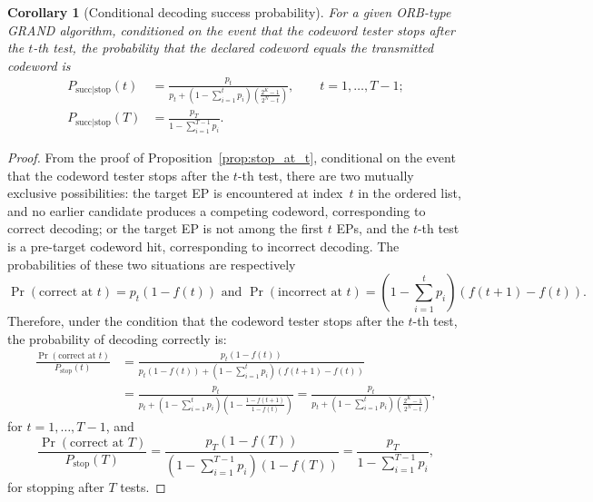 \documentclass[letterpaper,draftclsnofoot,onecolumn]{IEEEtran}
\newtheorem{corollary}{Corollary}
\begin{document}
\begin{corollary}[Conditional decoding success probability]\label{coro:stop_succ_prob}
    For a given ORB-type GRAND algorithm, conditioned on the event that the codeword tester stops after the $t$-th test, the probability that the declared codeword equals the transmitted codeword is
    \begin{align}
        P_{\text{succ}\mid\text{stop}}(t) &= \frac{p_t}{p_t + (1 - \sum_{i=1}^{t}p_i)\left( \frac{2^K-1}{2^N-t}\right)}, \quad\quad t = 1, \ldots, T - 1;\\
        P_{\text{succ}\mid\text{stop}}(T) &= \frac{p_T}{1 - \sum_{i=1}^{T-1}p_i}.
    \end{align}
\end{corollary}
\begin{proof}
    From the proof of Proposition~\ref{prop:stop_at_t}, conditional on the event that the codeword tester stops after the $t$-th test, there are two mutually exclusive possibilities: the target EP is encountered at index~$t$ in the ordered list, and no earlier candidate produces a competing codeword, corresponding to correct decoding; or the target EP is not among the first $t$ EPs, and the $t$-th test is a pre-target codeword hit, corresponding to incorrect decoding. The probabilities of these two situations are respectively
    \begin{equation}
        \Pr(\text{correct at }t) = p_t(1-f(t)) \text{ and } \Pr(\text{incorrect at }t) =  \left(1 - \sum_{i=1}^{t}p_i\right)(f(t+1)-f(t)).
    \end{equation}
    Therefore, under the condition that the codeword tester stops after the $t$-th test, the probability of decoding correctly is:
    \begin{align}
        \frac{\Pr(\text{correct at }t)}{P_{\text{stop}}(t)} & = \frac{p_t(1-f(t))}{p_t(1-f(t)) + (1 - \sum_{i=1}^{t}p_i)(f(t+1)-f(t))} \\
        & = \frac{p_t}{p_t + (1 - \sum_{i=1}^{t}p_i)\left(1 - \frac{1 - f(t+1)}{1 - f(t)}\right)} = \frac{p_t}{p_t + (1 - \sum_{i=1}^{t}p_i)\left( \frac{2^K-1}{2^N-t}\right)},
    \end{align}
    for $t = 1, \ldots, T - 1$, and
    \begin{equation}
        \frac{\Pr(\text{correct at }T)}{P_{\text{stop}}(T)} = \frac{p_T(1-f(T))}{(1-\sum_{i=1}^{T-1}p_i)(1 - f(T))} = \frac{p_T}{1 - \sum_{i=1}^{T-1}p_i},
    \end{equation}
    for stopping after $T$ tests.
\end{proof}
\end{document}

